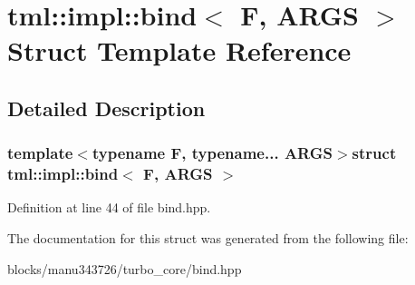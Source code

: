 \hypertarget{structtml_1_1impl_1_1bind}{\section{tml\+:\+:impl\+:\+:bind$<$ F, A\+R\+G\+S $>$ Struct Template Reference}
\label{structtml_1_1impl_1_1bind}
}


\subsection{Detailed Description}
\subsubsection*{template$<$typename F, typename... A\+R\+G\+S$>$struct tml\+::impl\+::bind$<$ F, A\+R\+G\+S $>$}



Definition at line 44 of file bind.\+hpp.



The documentation for this struct was generated from the following file\+:\begin{DoxyCompactItemize}
\item 
blocks/manu343726/turbo\+\_\+core/bind.\+hpp\end{DoxyCompactItemize}
